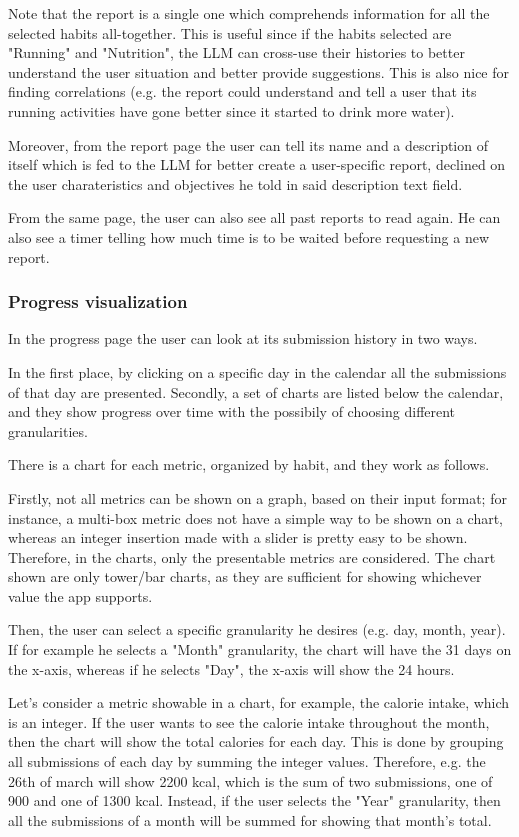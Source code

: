 \documentclass{article}
\begin{document}
Note that the report is a single one which comprehends information for all the selected habits all-together.
This is useful since if the habits selected are "Running" and "Nutrition", the LLM can cross-use their histories to better understand the user situation and better provide suggestions.
This is also nice for finding correlations (e.g. the report could understand and tell a user that its running activities have gone better since it started to drink more water).

Moreover, from the report page the user can tell its name and a description of itself which is fed to the LLM for better create a user-specific report, declined on the user charateristics and objectives he told in said description text field.

From the same page, the user can also see all past reports to read again.
He can also see a timer telling how much time is to be waited before requesting a new report.

\subsubsection{Progress visualization}

In the progress page the user can look at its submission history in two ways.

In the first place, by clicking on a specific day in the calendar all the submissions of that day are presented.
Secondly, a set of charts are listed below the calendar, and they show progress over time with the possibily of choosing different granularities.

There is a chart for each metric, organized by habit, and they work as follows.

Firstly, not all metrics can be shown on a graph, based on their input format; for instance, a multi-box metric does not have a simple way to be shown on a chart, whereas an integer insertion made with a slider is pretty easy to be shown.
Therefore, in the charts, only the presentable metrics are considered.
The chart shown are only tower/bar charts, as they are sufficient for showing whichever value the app supports.

Then, the user can select a specific granularity he desires (e.g. day, month, year).
If for example he selects a "Month" granularity, the chart will have the 31 days on the x-axis, whereas if he selects "Day", the x-axis will show the 24 hours.

Let's consider a metric showable in a chart, for example, the calorie intake, which is an integer.
If the user wants to see the calorie intake throughout the month, then the chart will show the total calories for each day.
This is done by grouping all submissions of each day by summing the integer values.
Therefore, e.g. the 26th of march will show 2200 kcal, which is the sum of two submissions, one of 900 and one of 1300 kcal.
Instead, if the user selects the "Year" granularity, then all the submissions of a month will be summed for showing that month's total.
\end{document}
